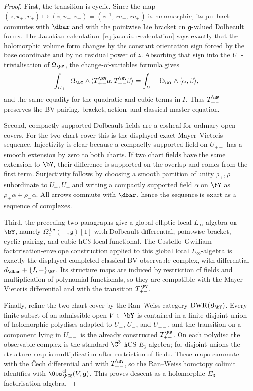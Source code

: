 \begin{proof}
First, the transition is cyclic.  Since the map
\((z,u_+,v_+)\mapsto(\tilde z,u_-,v_-)=(z^{-1},zu_+,zv_+)\) is
holomorphic, its pullback commutes with \(\dbar\) and with the pointwise
Lie bracket on \(\mathfrak g\)-valued Dolbeault forms.  The Jacobian
calculation~\eqref{eq:jacobian-calculation} says exactly that the
holomorphic volume form changes by the constant orientation sign forced
by the base coordinate and by no residual power of \(z\).  Absorbing
that sign into the \(U_-\)-trivialisation of \(\Omega_{\bY}\), the
change-of-variables formula gives
\[
 \int_{U_{+-}}\Omega_{\bY}\wedge
 \langle T_{+-}^{\BV}\alpha,T_{+-}^{\BV}\beta\rangle
 =
 \int_{U_{+-}}\Omega_{\bY}\wedge\langle\alpha,\beta\rangle ,
\]
and the same equality for the quadratic and cubic terms in \(I\).  Thus
\(T_{+-}^{\BV}\) preserves the BV pairing, bracket, action, and classical
master equation.

Second, compactly supported Dolbeault fields are a cosheaf for ordinary
open covers.  For the two-chart cover this is the displayed exact
Mayer--Vietoris sequence.  Injectivity is clear because a compactly
supported field on \(U_{+-}\) has a smooth extension by zero to both
charts.  If two chart fields have the same extension to \(\bY\), their
difference is supported on the overlap and comes from the first term.
Surjectivity follows by choosing a smooth partition of unity
\(\rho_+,\rho_-\) subordinate to \(U_+,U_-\) and writing a compactly
supported field \(\alpha\) on \(\bY\) as
\(\rho_+\alpha+\rho_-\alpha\).  All arrows commute with \(\dbar\), hence
the sequence is exact as a sequence of complexes.

Third, the preceding two paragraphs give a global elliptic local
\(L_\infty\)-algebra on \(\bY\), namely
\(\Omega_c^{0,\bullet}(-,\mathfrak g)[1]\) with Dolbeault differential,
pointwise bracket, cyclic pairing, and cubic hCS local functional.  The
Costello--Gwilliam factorisation-envelope construction applied to this
global local \(L_\infty\)-algebra is exactly the displayed completed
classical BV observable complex, with differential
\(d_{\dbar}+\{I,-\}_{\BV}\).  Its structure maps are induced by
restriction of fields and multiplication of polynomial functionals, so
they are compatible with the Mayer--Vietoris differential and with the
transition \(T_{+-}^{\BV}\).

Finally, refine the two-chart cover by the Ran--Weiss category
\(\mathrm{DWR}(\mathfrak U_{\bY})\).  Every finite subset of an admissible
open \(V\subset\bY\) is contained in a finite disjoint union of
holomorphic polydiscs adapted to \(U_+\), \(U_-\), and \(U_{+-}\), and
the transition on a component lying in \(U_{+-}\) is the already
constructed \(T_{+-}^{\BV}\).  On each polydisc the observable complex is
the standard \(\C^3\) hCS \(E_3\)-algebra; for disjoint unions the
structure map is multiplication after restriction of fields.  These maps
commute with the \v{C}ech differential and with \(T_{+-}^{\BV}\), so the
Ran--Weiss homotopy colimit identifies with
\(\Obs_{\hCS}^{\mathrm{cl}}(V,\mathfrak g)\).  This proves descent as a
holomorphic \(E_3\)-factorisation algebra.
\end{proof}

